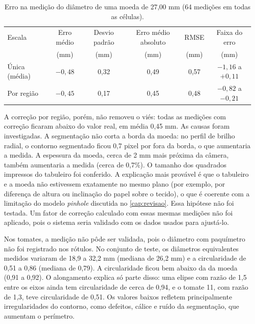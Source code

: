 \begin{table}[htb]
	\ABNTEXfontereduzida
	\centering
	\caption{\label{tab:moeda}Erro na medição do diâmetro de uma moeda de 27,00 mm (64 medições em todas as células).}
	\begin{tabular}{lccccc}
		\toprule
		Escala & Erro médio & Desvio padrão & Erro médio absoluto & RMSE & Faixa do erro \\
		 & (mm) & (mm) & (mm) & (mm) & (mm) \\
		\midrule
		Única (média) & $-0{,}48$ & 0,32 & 0,49 & 0,57 & $-1{,}16$ a $+0{,}11$ \\
		Por região & $-0{,}45$ & 0,17 & 0,45 & 0,48 & $-0{,}82$ a $-0{,}21$ \\
		\bottomrule
	\end{tabular}
\end{table}

A correção por região, porém, não removeu o viés: todas as medições com correção ficaram abaixo do valor real, em média 0,45 mm. As causas foram investigadas. A segmentação não corta a borda da moeda: no perfil de brilho radial, o contorno segmentado ficou 0,7 pixel por fora da borda, o que aumentaria a medida. A espessura da moeda, cerca de 2 mm mais próxima da câmera, também aumentaria a medida (cerca de 0,7\%). O tamanho dos quadrados impressos do tabuleiro foi conferido. A explicação mais provável é que o tabuleiro e a moeda não estivessem exatamente no mesmo plano (por exemplo, por diferença de altura ou inclinação do papel sobre o tecido), o que é coerente com a limitação do modelo \textit{pinhole} discutida no \autoref{cap:revisao}. Essa hipótese não foi testada. Um fator de correção calculado com essas mesmas medições não foi aplicado, pois o sistema seria validado com os dados usados para ajustá-lo.

Nos tomates, a medição não pôde ser validada, pois o diâmetro com paquímetro não foi registrado nos rótulos. No conjunto de teste, os diâmetros equivalentes medidos variaram de 18,9 a 32,2 mm (mediana de 26,2 mm) e a circularidade de 0,51 a 0,86 (mediana de 0,79). A circularidade ficou bem abaixo da da moeda (0,91 a 0,92). O alongamento explica só parte disso: uma elipse com razão de 1,5 entre os eixos ainda tem circularidade de cerca de 0,94, e o tomate 11, com razão de 1,3, teve circularidade de 0,51. Os valores baixos refletem principalmente irregularidades do contorno, como defeitos, cálice e ruído da segmentação, que aumentam o perímetro.

